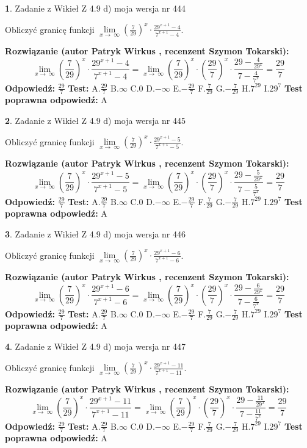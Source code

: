 \documentclass[12pt, a4paper]{article}
\theoremstyle{definition} %
\newtheorem{zad}{}
\newcommand{\zadStart}[1]{\begin{zad}#1\newline}
\newcommand{\zadStop}{\end{zad}}
\newcommand{\rozwStart}[2]{\noindent \textbf{Rozwiązanie (autor #1 , recenzent #2): }\newline}
\newcommand{\rozwStop}{\newline}
\newcommand{\odpStart}{\noindent \textbf{Odpowiedź:}\newline}
\newcommand{\odpStop}{\newline}
\newcommand{\testStart}{\noindent \textbf{Test:}\newline}
\newcommand{\testStop}{\newline}
\newcommand{\kluczStart}{\noindent \textbf{Test poprawna odpowiedź:}\newline}
\newcommand{\kluczStop}{\newline}
\begin{document}
\zadStart{Zadanie z Wikieł Z 4.9 d) moja wersja nr 444}


Obliczyć granicę funkcji  $\lim\limits_{x\to\ \infty}(\frac{7}{29})^{x}\cdot\frac{29^{x+1}-4}{7^{x+1}-4}$.
\zadStop
\rozwStart{Patryk Wirkus}{Szymon Tokarski}
$$\lim\limits_{x\to\ \infty}(\frac{7}{29})^{x}\cdot\frac{29^{x+1}-4}{7^{x+1}-4}=\lim\limits_{x\to\ \infty}(\frac{7}{29})^{x}\cdot(\frac{29}{7})^{x} \cdot \frac{29-\frac{4}{29^{x}}}{7-\frac{4}{7^{x}}} = \frac{29}{7}$$
\rozwStop
\odpStart
$\frac{29}{7}$
\odpStop
\testStart
A.$\frac{29}{7}$ B.$\infty$ C.$0$ D.$-\infty$ E.$-\frac{29}{7}$
F.$\frac{7}{29}$ G.$-\frac{7}{29}$
H.$7^{29}$
I.$29^{7}$
\testStop
\kluczStart
A
\kluczStop



\zadStart{Zadanie z Wikieł Z 4.9 d) moja wersja nr 445}


Obliczyć granicę funkcji  $\lim\limits_{x\to\ \infty}(\frac{7}{29})^{x}\cdot\frac{29^{x+1}-5}{7^{x+1}-5}$.
\zadStop
\rozwStart{Patryk Wirkus}{Szymon Tokarski}
$$\lim\limits_{x\to\ \infty}(\frac{7}{29})^{x}\cdot\frac{29^{x+1}-5}{7^{x+1}-5}=\lim\limits_{x\to\ \infty}(\frac{7}{29})^{x}\cdot(\frac{29}{7})^{x} \cdot \frac{29-\frac{5}{29^{x}}}{7-\frac{5}{7^{x}}} = \frac{29}{7}$$
\rozwStop
\odpStart
$\frac{29}{7}$
\odpStop
\testStart
A.$\frac{29}{7}$ B.$\infty$ C.$0$ D.$-\infty$ E.$-\frac{29}{7}$
F.$\frac{7}{29}$ G.$-\frac{7}{29}$
H.$7^{29}$
I.$29^{7}$
\testStop
\kluczStart
A
\kluczStop



\zadStart{Zadanie z Wikieł Z 4.9 d) moja wersja nr 446}


Obliczyć granicę funkcji  $\lim\limits_{x\to\ \infty}(\frac{7}{29})^{x}\cdot\frac{29^{x+1}-6}{7^{x+1}-6}$.
\zadStop
\rozwStart{Patryk Wirkus}{Szymon Tokarski}
$$\lim\limits_{x\to\ \infty}(\frac{7}{29})^{x}\cdot\frac{29^{x+1}-6}{7^{x+1}-6}=\lim\limits_{x\to\ \infty}(\frac{7}{29})^{x}\cdot(\frac{29}{7})^{x} \cdot \frac{29-\frac{6}{29^{x}}}{7-\frac{6}{7^{x}}} = \frac{29}{7}$$
\rozwStop
\odpStart
$\frac{29}{7}$
\odpStop
\testStart
A.$\frac{29}{7}$ B.$\infty$ C.$0$ D.$-\infty$ E.$-\frac{29}{7}$
F.$\frac{7}{29}$ G.$-\frac{7}{29}$
H.$7^{29}$
I.$29^{7}$
\testStop
\kluczStart
A
\kluczStop



\zadStart{Zadanie z Wikieł Z 4.9 d) moja wersja nr 447}


Obliczyć granicę funkcji  $\lim\limits_{x\to\ \infty}(\frac{7}{29})^{x}\cdot\frac{29^{x+1}-11}{7^{x+1}-11}$.
\zadStop
\rozwStart{Patryk Wirkus}{Szymon Tokarski}
$$\lim\limits_{x\to\ \infty}(\frac{7}{29})^{x}\cdot\frac{29^{x+1}-11}{7^{x+1}-11}=\lim\limits_{x\to\ \infty}(\frac{7}{29})^{x}\cdot(\frac{29}{7})^{x} \cdot \frac{29-\frac{11}{29^{x}}}{7-\frac{11}{7^{x}}} = \frac{29}{7}$$
\rozwStop
\odpStart
$\frac{29}{7}$
\odpStop
\testStart
A.$\frac{29}{7}$ B.$\infty$ C.$0$ D.$-\infty$ E.$-\frac{29}{7}$
F.$\frac{7}{29}$ G.$-\frac{7}{29}$
H.$7^{29}$
I.$29^{7}$
\testStop
\kluczStart
A
\kluczStop
\end{document}

